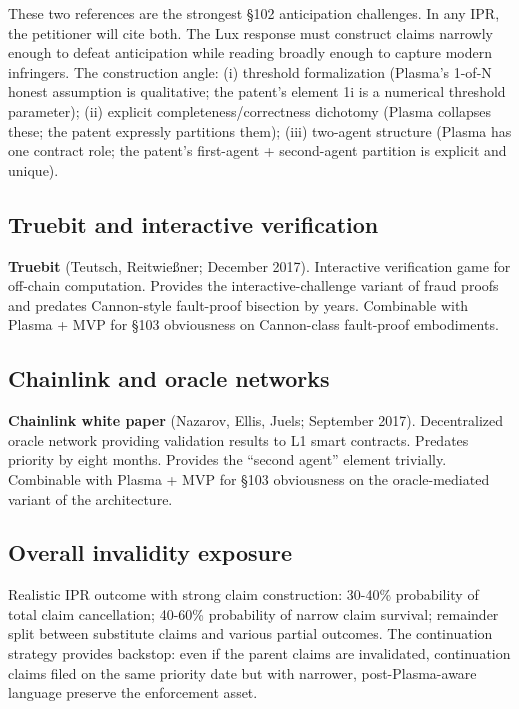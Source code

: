 \documentclass[11pt,letterpaper]{article}
\begin{document}
These two references are the strongest §102 anticipation challenges. In any IPR, the petitioner will cite both. The Lux response must construct claims narrowly enough to defeat anticipation while reading broadly enough to capture modern infringers. The construction angle: (i) threshold formalization (Plasma's 1-of-N honest assumption is qualitative; the patent's element 1i is a numerical threshold parameter); (ii) explicit completeness/correctness dichotomy (Plasma collapses these; the patent expressly partitions them); (iii) two-agent structure (Plasma has one contract role; the patent's first-agent + second-agent partition is explicit and unique).

\subsection{Truebit and interactive verification}

\textbf{Truebit} (Teutsch, Reitwie{\ss}ner; December 2017). Interactive verification game for off-chain computation. Provides the interactive-challenge variant of fraud proofs and predates Cannon-style fault-proof bisection by years. Combinable with Plasma + MVP for §103 obviousness on Cannon-class fault-proof embodiments.

\subsection{Chainlink and oracle networks}

\textbf{Chainlink white paper} (Nazarov, Ellis, Juels; September 2017). Decentralized oracle network providing validation results to L1 smart contracts. Predates priority by eight months. Provides the ``second agent'' element trivially. Combinable with Plasma + MVP for §103 obviousness on the oracle-mediated variant of the architecture.

\subsection{Overall invalidity exposure}

Realistic IPR outcome with strong claim construction: 30-40\% probability of total claim cancellation; 40-60\% probability of narrow claim survival; remainder split between substitute claims and various partial outcomes. The continuation strategy provides backstop: even if the parent claims are invalidated, continuation claims filed on the same priority date but with narrower, post-Plasma-aware language preserve the enforcement asset.
\end{document}
